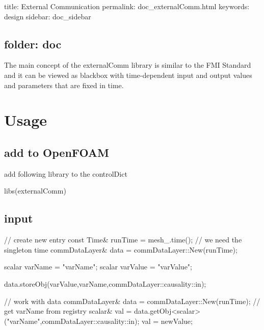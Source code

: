 

 title\+: External Communication permalink\+: doc\+\_\+external\+Comm.\+html keywords\+: design sidebar\+: doc\+\_\+sidebar \subsection*{folder\+: doc }

The main concept of the external\+Comm library is similar to the F\+MI Standard and it can be viewed as blackbox with time-\/dependent input and output values and parameters that are fixed in time.

\section*{Usage}

\subsection*{add to Open\+F\+O\+AM}

add following library to the control\+Dict


\begin{DoxyCode}
libs(externalComm)
\end{DoxyCode}


\subsection*{input}


\begin{DoxyCode}
\textcolor{comment}{// create new entry}
\textcolor{keyword}{const} Time& runTime = mesh\_.time(); \textcolor{comment}{// we need the singleton time}
commDataLayer& data = commDataLayer::New(runTime);

scalar varName = \textcolor{stringliteral}{"varName"};
scalar varValue = \textcolor{stringliteral}{"varValue"};

data.storeObj(varValue,varName,commDataLayer::causality::in);
\end{DoxyCode}



\begin{DoxyCode}
\textcolor{comment}{// work with data}
commDataLayer& data = commDataLayer::New(runTime);
\textcolor{comment}{// get varName from registry}
scalar& val = data.getObj<scalar>(\textcolor{stringliteral}{"varName"},commDataLayer::causality::in);
val = newValue;
\end{DoxyCode}


